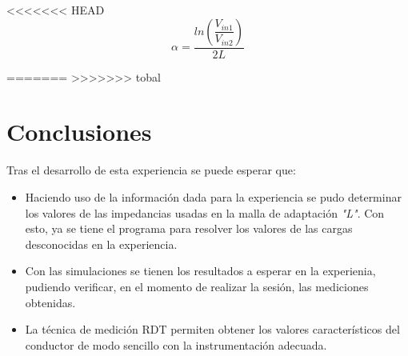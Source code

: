 \documentclass[11pt,onecolumn]{article}
\begin{document}
<<<<<<< HEAD
\begin{equation}
\alpha = \dfrac{ln\left(\dfrac{V_{in1}}{V_{in2}}\right)}{2L}
\end{equation}



=======
>>>>>>> tobal
\newpage
\section{Conclusiones}

Tras el desarrollo de esta experiencia se puede esperar que:
\begin{itemize}
\item Haciendo uso de la información dada para la experiencia se pudo determinar los valores de las impedancias usadas en la malla de adaptación \textit{"L"}. Con esto, ya se tiene el programa para resolver los valores de las cargas desconocidas en la experiencia.
\item Con las simulaciones se tienen los resultados a esperar en la experienia, pudiendo verificar, en el momento de realizar la sesión, las mediciones obtenidas.
\item La técnica de medición RDT permiten obtener los valores característicos del conductor de modo sencillo con la instrumentación adecuada.
\end{itemize}
\end{document}
